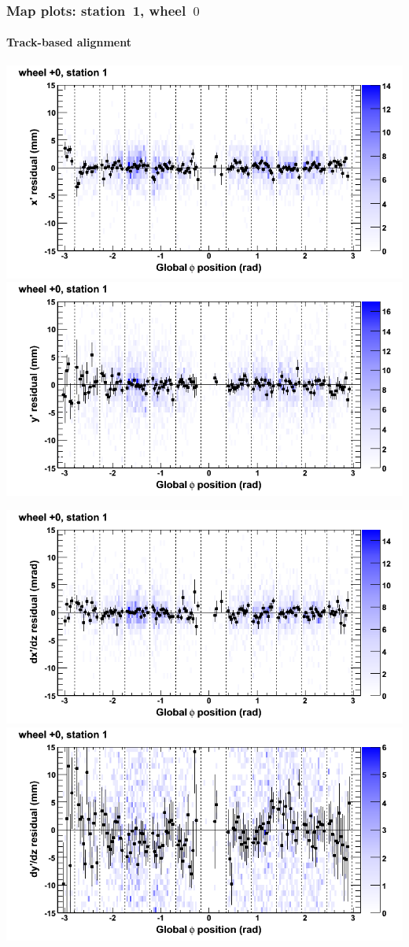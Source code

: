 \documentclass[compress]{beamer}
\begin{document}
\begin{frame}
\frametitle{Map plots: station~1, wheel~$0$}
\framesubtitle{Track-based alignment}
\includegraphics[width=0.5\linewidth]{mapplots_re05/DTvsphi_st1whC_x.png}
\includegraphics[width=0.5\linewidth]{mapplots_re05/DTvsphi_st1whC_y.png}

\includegraphics[width=0.5\linewidth]{mapplots_re05/DTvsphi_st1whC_dxdz.png}
\includegraphics[width=0.5\linewidth]{mapplots_re05/DTvsphi_st1whC_dydz.png}
\end{frame}
\end{document}

